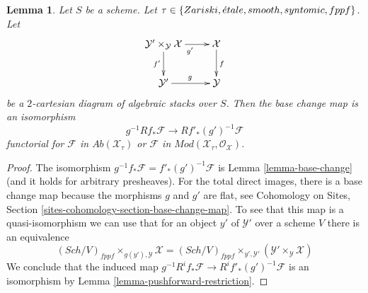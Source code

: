 \documentclass[10pt,a4paper]{amsart}
\theoremstyle{plain}
\newtheorem{lemma}[subsection]{Lemma}
\theoremstyle{definition}
\theoremstyle{remark}
\numberwithin{equation}{subsection}
\def\Sch{\mathit{Sch}}
\def\etale{{\acute{e}tale}}
\begin{document}
\begin{lemma}
\label{lemma-base-change-higher-direct-images}
Let $S$ be a scheme. Let
$\tau \in \{Zariski,\linebreak[0] \etale,\linebreak[0]
smooth,\linebreak[0] syntomic,\linebreak[0] fppf\}$. Let
$$
\xymatrix{
\mathcal{Y}' \times_\mathcal{Y} \mathcal{X} \ar[r]_{g'} \ar[d]_{f'} &
\mathcal{X} \ar[d]^f \\
\mathcal{Y}' \ar[r]^g & \mathcal{Y}
}
$$
be a $2$-cartesian diagram of algebraic stacks over $S$. Then the base change
map is an isomorphism
$$
g^{-1}Rf_*\mathcal{F} \longrightarrow Rf'_*(g')^{-1}\mathcal{F}
$$
functorial for $\mathcal{F}$ in $\textit{Ab}(\mathcal{X}_\tau)$
or $\mathcal{F}$ in $\textit{Mod}(\mathcal{X}_\tau, \mathcal{O}_\mathcal{X})$.
\end{lemma}

\begin{proof}
The isomorphism $g^{-1}f_*\mathcal{F} = f'_*(g')^{-1}\mathcal{F}$ is
Lemma \ref{lemma-base-change} (and it holds for arbitrary presheaves).
For the total direct images, there is a base change map because the
morphisms $g$ and $g'$ are flat, see
Cohomology on Sites, Section \ref{sites-cohomology-section-base-change-map}.
To see that this map is a quasi-isomorphism we can use that for
an object $y'$ of $\mathcal{Y}'$ over a scheme $V$ there is an equivalence
$$
(\Sch/V)_{fppf} \times_{g(y'), \mathcal{Y}} \mathcal{X}
=
(\Sch/V)_{fppf} \times_{y', \mathcal{Y}'}
(\mathcal{Y}' \times_\mathcal{Y} \mathcal{X})
$$
We conclude that the induced map
$g^{-1}R^if_*\mathcal{F} \to R^if'_*(g')^{-1}\mathcal{F}$
is an isomorphism by
Lemma \ref{lemma-pushforward-restriction}.
\end{proof}
\end{document}
